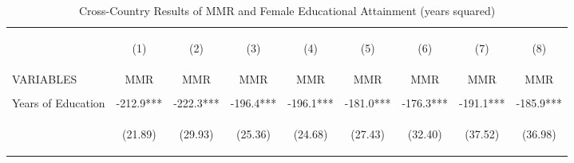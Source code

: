 \begin{table}[htpb!]\begin{center}\caption{Cross-Country Results of MMR and Female Educational Attainment (years squared)}\label{MMRtab:MMRyrssq}\begin{tabular}{lcccccccc}\toprule&\begin{footnotesize}(1)\end{footnotesize}&\begin{footnotesize}(2)\end{footnotesize}&\begin{footnotesize}(3)\end{footnotesize}&\begin{footnotesize}(4)\end{footnotesize}&\begin{footnotesize}(5)\end{footnotesize}&\begin{footnotesize}(6)\end{footnotesize}&\begin{footnotesize}(7)\end{footnotesize}&\begin{footnotesize}(8) \end{footnotesize}\\
VARIABLES&MMR&MMR&MMR&MMR&MMR&MMR&MMR&MMR\\ \midrule
&&&&&&&&\\
Years of Education&-212.9***&-222.3***&-196.4***&-196.1***&-181.0***&-176.3***&-191.1***&-185.9***\\
&\begin{footnotesize}(21.89)\end{footnotesize}&\begin{footnotesize}(29.93)\end{footnotesize}&\begin{footnotesize}(25.36)\end{footnotesize}&\begin{footnotesize}(24.68)\end{footnotesize}&\begin{footnotesize}(27.43)\end{footnotesize}&\begin{footnotesize}(32.40)\end{footnotesize}&\begin{footnotesize}(37.52)\end{footnotesize}&\begin{footnotesize}(36.98)\end{footnotesize}\\

\end{tabular}
\end{center}
\end{table}
